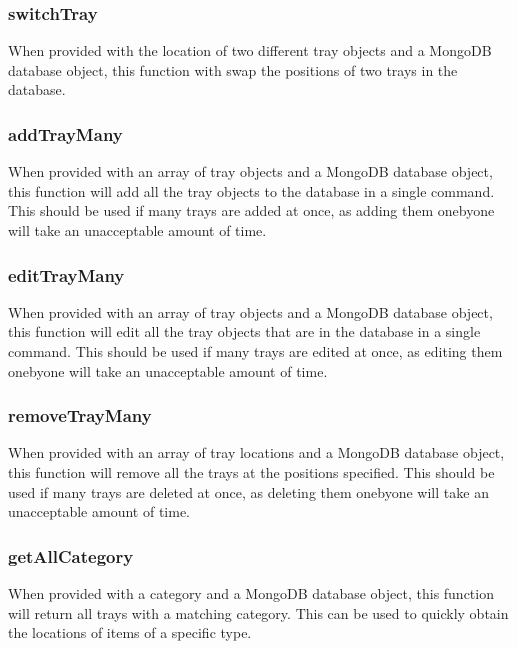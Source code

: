 \documentclass[letterpaper,10pt,english]{sphinxmanual}
\begin{document}
\subsubsection{switchTray}
\label{\detokenize{docs/System_Overview/Backend_overview:switchtray}}
When provided with the location of two different tray objects and a
MongoDB database object, this function with swap the positions of two
trays in the database.


\subsubsection{addTrayMany}
\label{\detokenize{docs/System_Overview/Backend_overview:addtraymany}}
When provided with an array of tray objects and a MongoDB database
object, this function will add all the tray objects to the database in a
single command. This should be used if many trays are added at once, as
adding them one\sphinxhyphen{}by\sphinxhyphen{}one will take an unacceptable amount of time.


\subsubsection{editTrayMany}
\label{\detokenize{docs/System_Overview/Backend_overview:edittraymany}}
When provided with an array of tray objects and a MongoDB database
object, this function will edit all the tray objects that are in the
database in a single command. This should be used if many trays are
edited at once, as editing them one\sphinxhyphen{}by\sphinxhyphen{}one will take an unacceptable
amount of time.


\subsubsection{removeTrayMany}
\label{\detokenize{docs/System_Overview/Backend_overview:removetraymany}}
When provided with an array of tray locations and a MongoDB database
object, this function will remove all the trays at the positions
specified. This should be used if many trays are deleted at once, as
deleting them one\sphinxhyphen{}by\sphinxhyphen{}one will take an unacceptable amount of time.


\subsubsection{getAllCategory}
\label{\detokenize{docs/System_Overview/Backend_overview:getallcategory}}
When provided with a category and a MongoDB database object, this
function will return all trays with a matching category. This can be
used to quickly obtain the locations of items of a specific type.
\end{document}

